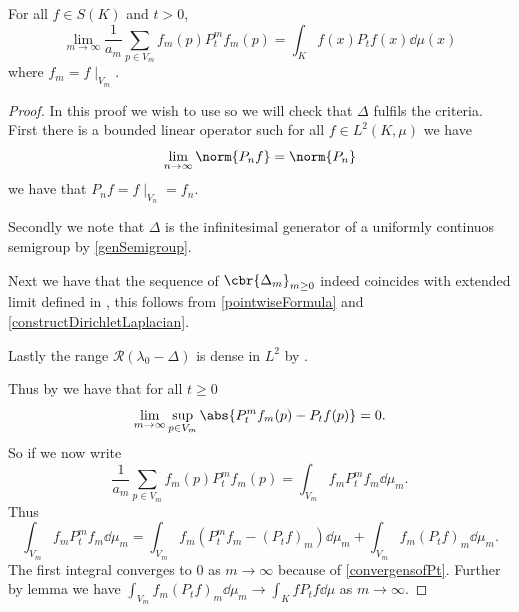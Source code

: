 \begin{lemma}\label{convergenceOfSemigroups}
	For all $f \in S(K)$ and $t > 0$,
	\begin{equation}
		\lim_{m \to \infty} \frac{1}{a_m} \sum_{p \in V_m} f_m(p)P_t^{m} f_m(p) = \int_{K}f(x)P_tf(x) \dd\mu (x)
	\end{equation}
	where $f_m = f \mid_{V_m}$.
\end{lemma}
\begin{proof}
	In this proof we wish to use \cite[theorem 2.1]{KURTZ1969354}  so we will check that $\Delta$ fulfils the criteria. First there is a bounded linear operator such for all $f \in L^{2}(K, \mu)$ we have 
	$$\lim_{n \to \infty} \norm{P_n f} = \norm{P_n}$$
	we have that $P_n f = f \mid_{V_n} = f_n$.
	
	Secondly we note that $\Delta$ is the infinitesimal generator of a uniformly continuos semigroup by \cref{genSemigroup}.
	
	Next we have that the sequence of $\cbr{\Delta_m}_{m \geq 0}$ indeed coincides with extended limit defined in \cite[page 355]{KURTZ1969354}, this follows from \cref{pointwiseFormula} and \cref{constructDirichletLaplacian}. 
	
	Lastly the range $\mathcal{R}(\lambda_0 - \Delta)$ is dense in $L^2$ by \cite[1.1.1]{fabriceDirichelt}.
	
	Thus by \cite[theorem 2.1]{KURTZ1969354}  we have that for all $t \geq 0$
	\begin{equation}\label{convergensofPt}
		\lim_{m \to \infty} \sup_{p \in V_m} \abs{P_t^{m}f_m(p) - P_t f(p)} = 0.
	\end{equation}
	So if we now write 
	\begin{equation}
		\frac{1}{a_m} \sum_{p \in V_m} f_m(p) P_t^{m}f_m(p) = \int_{V_m} f_m P_t^{m} f_m \dd \mu_m.
	\end{equation}
	Thus 
	\begin{equation}
		\int_{V_m} f_m P_t^{m} f_m \dd\mu_m = 		\int_{V_m} f_m \left(P_t^{m} f_m - (P_t f)_m \right) \dd\mu_m + \int_{V_m} f_m (P_t f)_m \dd \mu_m .
	\end{equation}
	The first integral converges to $0$ as $m\to \infty$ because of \eqref{convergensofPt}. Further by lemma we have \newline $\int_{V_m} f_m (P_t f)_m \dd \mu_m \to \int_{K} fP_tf \dd \mu$ as $m \to \infty$.
\end{proof}

